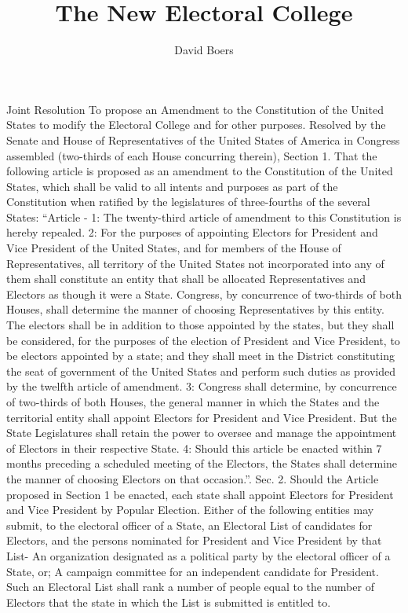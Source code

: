 \documentclass{article}
\title{The New Electoral College}
\author{David Boers}
\begin{document}
    Joint Resolution
    To propose an Amendment to the Constitution of the United States to modify the Electoral College and for other purposes.
    Resolved by the Senate and House of Representatives of the United States of America in Congress assembled (two-thirds of each House concurring therein),
    Section 1. That the following article is proposed as an amendment to the Constitution of the United States, which shall be valid to all intents and purposes as part of the Constitution when ratified by the legislatures of three-fourths of the several States:
    “Article -
    1: The twenty-third article of amendment to this Constitution is hereby repealed.
    2: For the purposes of appointing Electors for President and Vice President of the United States, and for members of the House of Representatives, all territory of the United States not incorporated into any of them shall constitute an entity that shall be allocated Representatives and Electors as though it were a State. Congress, by concurrence of two-thirds of both Houses, shall determine the manner of choosing Representatives by this entity. The electors shall be in addition to those appointed by the states, but they shall be considered, for the purposes of the election of President and Vice President, to be electors appointed by a state; and they shall meet in the District constituting the seat of government of the United States and perform such duties as provided by the twelfth article of amendment.
    3: Congress shall determine, by concurrence of two-thirds of both Houses, the general manner in which the States and the territorial entity shall appoint Electors for President and Vice President. But the State Legislatures shall retain the power to oversee and manage the appointment of Electors in their respective State. 
    4: Should this article be enacted within 7 months preceding a scheduled meeting of the Electors, the States shall determine the manner of choosing Electors on that occasion.”.
    Sec. 2. Should the Article proposed in Section 1 be enacted, each state shall appoint Electors for President and Vice President by Popular Election. 
    Either of the following entities may submit, to the electoral officer of a State, an Electoral List of candidates for Electors, and the persons nominated for President and Vice President by that List-
    An organization designated as a political party by the electoral officer of a State, or;
    A campaign committee for an independent candidate for President.
    Such an Electoral List shall rank a number of people equal to the number of Electors that the state in which the List is submitted is entitled to. 
\end{document}

